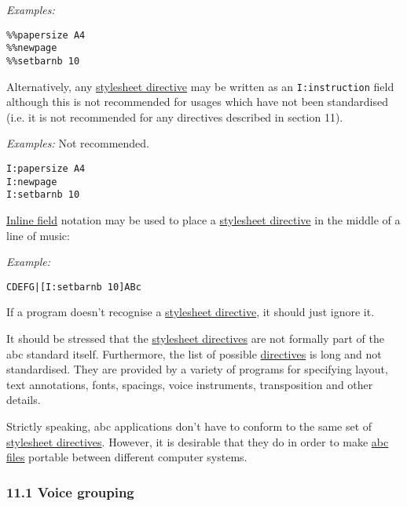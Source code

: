 \emph{Examples:}

\begin{verbatim}
%%papersize A4
%%newpage
%%setbarnb 10
\end{verbatim}

Alternatively, any
\protect\hyperlink{stylesheet_directive_definition}{stylesheet
directive} may be written as an \texttt{I:instruction} field although
this is not recommended for usages which have not been standardised
(i.e. it is not recommended for any directives described in section 11).

\emph{Examples:} Not recommended.

\begin{verbatim}
I:papersize A4
I:newpage
I:setbarnb 10
\end{verbatim}

\protect\hyperlink{inline_field_definition}{Inline field} notation may
be used to place a
\protect\hyperlink{stylesheet_directive_definition}{stylesheet
directive} in the middle of a line of music:

\emph{Example:}

\begin{verbatim}
CDEFG|[I:setbarnb 10]ABc
\end{verbatim}

If a program doesn't recognise a
\protect\hyperlink{stylesheet_directive_definition}{stylesheet
directive}, it should just ignore it.

It should be stressed that the
\protect\hyperlink{stylesheet_directive_definition}{stylesheet
directives} are not formally part of the abc standard itself.
Furthermore, the list of possible
\protect\hyperlink{stylesheet_directive_definition}{directives} is long
and not standardised. They are provided by a variety of programs for
specifying layout, text annotations, fonts, spacings, voice instruments,
transposition and other details.

Strictly speaking, abc applications don't have to conform to the same
set of \protect\hyperlink{stylesheet_directive_definition}{stylesheet
directives}. However, it is desirable that they do in order to make
\protect\hyperlink{abc_file_definition}{abc files} portable between
different computer systems.

\hypertarget{voice_grouping}{\subsubsection{11.1 Voice
grouping}\label{voice_grouping}}

